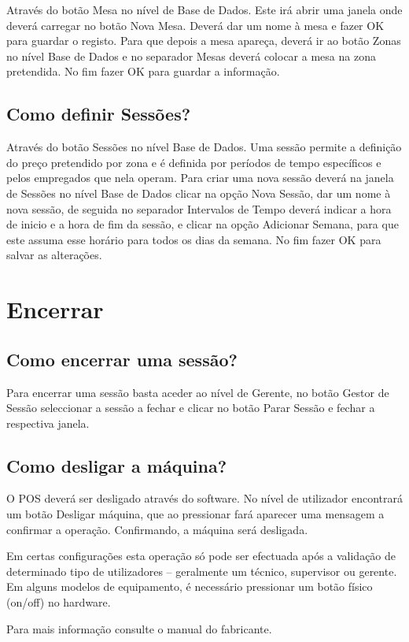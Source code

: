 \documentclass[a4paper,11pt,openany]{memoir}
\begin{document}
Através do botão Mesa no nível de Base de Dados. Este irá abrir uma janela onde
deverá carregar no botão Nova Mesa. Deverá dar um nome à mesa e fazer OK para
guardar o registo. Para que depois a mesa apareça, deverá ir ao botão Zonas no
nível Base de Dados e no separador Mesas deverá colocar a mesa na zona
pretendida. No fim fazer OK para guardar a informação.

\section{Como definir Sessões?}
Através do botão Sessões no nível Base de Dados. Uma sessão permite a definição
do preço pretendido por zona e é definida por períodos de tempo específicos e pelos
empregados que nela operam. Para criar uma nova sessão deverá na janela de
Sessões no nível Base de Dados clicar na opção Nova Sessão, dar um nome à nova
sessão, de seguida no separador Intervalos de Tempo deverá indicar a hora de
inicio e a hora de fim da sessão, e clicar na opção Adicionar Semana, para que este
assuma esse horário para todos os dias da semana. No fim fazer OK para salvar as
alterações.


\chapter{Encerrar}
\section{Como encerrar uma sessão?}
Para encerrar uma sessão basta aceder ao nível de Gerente, no botão Gestor de
Sessão seleccionar a sessão a fechar e clicar no botão Parar Sessão e fechar a
respectiva janela.

\section{Como desligar a máquina?}
O POS deverá ser desligado através do software. No nível de utilizador encontrará
um botão Desligar máquina, que ao pressionar fará aparecer uma mensagem a
confirmar a operação. Confirmando, a máquina será desligada.

Em certas configurações esta operação só pode ser efectuada após a validação de
determinado tipo de utilizadores – geralmente um técnico, supervisor ou gerente.
Em alguns modelos de equipamento, é necessário pressionar um botão físico
(on/off) no hardware.

Para mais informação consulte o manual do fabricante.
\end{document}
